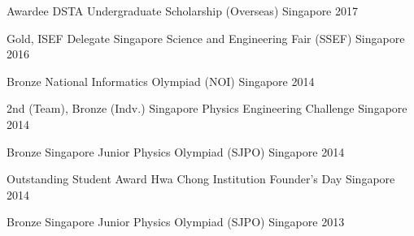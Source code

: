 \begin{cvhonors}


\cvhonor
{Awardee} %
{DSTA Undergraduate Scholarship (Overseas)} %
{Singapore} %
{2017} %


\cvhonor
{Gold, ISEF Delegate} %
{Singapore Science and Engineering Fair (SSEF)} %
{Singapore} %
{2016} %


\cvhonor
{Bronze} %
{National Informatics Olympiad (NOI)} %
{Singapore} %
{2014} %


\cvhonor
{2nd (Team), Bronze (Indv.)} %
{Singapore Physics Engineering Challenge} %
{Singapore} %
{2014} %


\cvhonor
{Bronze} %
{Singapore Junior Physics Olympiad (SJPO)} %
{Singapore} %
{2014} %


\cvhonor
{Outstanding Student Award} %
{Hwa Chong Institution Founder's Day} %
{Singapore} %
{2014} %



\cvhonor
{Bronze} %
{Singapore Junior Physics Olympiad (SJPO)} %
{Singapore} %
{2013} %


\end{cvhonors}